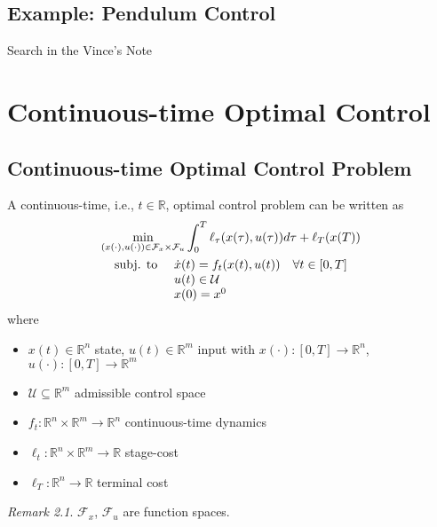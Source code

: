 \documentclass[openany]{book}
\theoremstyle{definition}
\theoremstyle{remark}
\newtheorem*{remark}{Remark}
\begin{document}
\section{Example: Pendulum Control}
Search in the Vince's Note



\chapter{Continuous-time Optimal Control}

\section{Continuous-time Optimal Control Problem}
A continuous-time, i.e., $t \in \mathbb{R}$, optimal control problem can be written as
\begin{gather*}
    \min_{(x(\cdot),u(\cdot))\in \mathcal{F}_x \times \mathcal{F}_u} \int_{0}^{T}\ell_\tau(x(\tau),u(\tau))d\tau+\ell_T(x(T))\\
    \begin{array}{l l }
        \text{subj. to } & \dot{x}(t) = f_t(x(t),u(t)) \quad \forall t \in [0,T]\\
                         & u(t) \in \mathcal{U}\\
                         & x(0) = x^0
    \end{array}
\end{gather*}
where
\begin{itemize}
    \item $x(t) \in \mathbb{R}^n$ state, $u(t) \in \mathbb{R}^m$ input with $x(\cdot):[0,T]\to\mathbb{R}^n$, $u(\cdot):[0,T]\to\mathbb{R}^m$
    \item $\mathcal{U} \subseteq \mathbb{R}^m$ admissible control space
    \item $f_t: \mathbb{R}^n \times \mathbb{R}^m \to \mathbb{R}^n$ continuous-time dynamics
    \item $\ell_t: \mathbb{R}^n \times \mathbb{R}^m \to \mathbb{R}$ stage-cost
    \item $\ell_T: \mathbb{R}^n \to \mathbb{R}$ terminal cost
\end{itemize}

\begin{remark}
$\mathcal{F}_x$, $\mathcal{F}_u$ are function spaces.
\end{remark}
\end{document}
